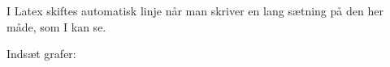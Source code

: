 \begin{flushleft} %


I Latex skiftes automatisk linje når man skriver en lang sætning på den her måde, som I kan se.

\addlinespace %

Indsæt grafer:



\end{flushleft}